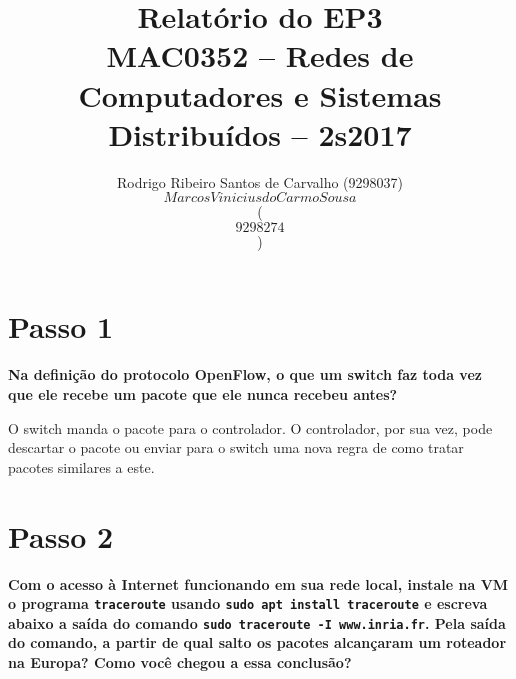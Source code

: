 \documentclass[12pt,letterpaper]{article}
\title{Relatório do EP3\\MAC0352 -- Redes de Computadores e Sistemas Distribuídos -- 2s2017}
\author{Rodrigo Ribeiro Santos de Carvalho (9298037)\\
$$Marcos Vinicius do Carmo Sousa$$ ($$9298274$$)}
\date{}
\begin{document}
\maketitle

\section{Passo 1}

\textbf{Na definição do protocolo OpenFlow, o que um switch faz toda
vez que ele recebe um pacote que ele nunca recebeu antes?}

O switch manda o pacote para o controlador. O controlador, por sua vez, pode descartar o pacote ou enviar para o switch uma nova regra de como tratar pacotes similares a este.

\section{Passo 2}

\textbf{Com o acesso à Internet funcionando em sua rede local, instale
na VM o programa \texttt{traceroute} usando \texttt{sudo apt install
traceroute} e escreva abaixo a saída do comando \texttt{sudo
traceroute -I www.inria.fr}. Pela saída do comando, a partir de qual
salto os pacotes alcançaram um roteador na Europa? Como você chegou a
essa conclusão?} 
\end{document}
